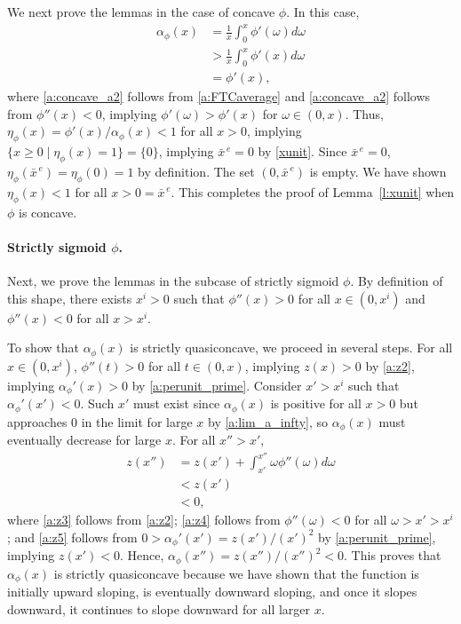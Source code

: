 \documentclass[12pt]{article}
\newcommand{\efficacy}{\phi}
\newcommand{\xunitbar}{\bar{x}^{\,e}}
\newcommand{\xpoi}{x^{i}}
\newcommand{\elasticity}[1]{\eta_{#1}}
\newcommand{\perunit}[1]{\alpha_{#1}}
\begin{document}
We next prove the lemmas in the case of concave $\efficacy$. In
this case,
\begin{align}
\perunit{\efficacy}\!(x) & = \frac{1}{x} \int_0^x \efficacy'(\omega) d\omega \label{a:concave_a1} \\
& > \frac{1}{x} \int_0^x \efficacy'(x) d\omega \label{a:concave_a2} \\
& = \efficacy'(x), \label{a:concave_a3}
\end{align}
where \eqref{a:concave_a2} follows from \eqref{a:FTCaverage} and
\eqref{a:concave_a2} follows from $\efficacy''(x) < 0$, implying
$\efficacy'(\omega) > \efficacy'(x)$ for $\omega \in (0,x)$. Thus,
$\elasticity{\efficacy} \!(x) = \efficacy'(x) /
\perunit{\efficacy}\!(x) < 1$ for all $x > 0$, implying $\{ x \geq 0
\mid \elasticity{\efficacy}\!(x) = 1 \} = \{ 0 \}$, implying $\xunitbar =
0$ by \eqref{xunit}. Since $\xunitbar = 0$,
$\elasticity{\efficacy}\!(\xunitbar) = \elasticity{\efficacy}\!(0) = 1$
by definition. The set $(0,\xunitbar)$ is empty. We have shown
$\elasticity{\efficacy}\!(x) < 1$ for all $x > 0 = \xunitbar$. This
completes the proof of Lemma~\ref{l:xunit} when $\efficacy$ is
concave.

\paragraph{Strictly sigmoid $\efficacy$.} 

Next, we prove the lemmas in the subcase of strictly sigmoid
$\efficacy$. By definition of this shape, there exists $\xpoi > 0$
such that $\efficacy''(x) > 0$ for all $x \in (0, \xpoi)$ and
$\efficacy''(x) < 0$ for all $x > \xpoi$.

To show that $\perunit{\efficacy}\!(x)$ is strictly quasiconcave, we
proceed in several steps. For all $x \in (0, \xpoi)$, $\efficacy''(t)
> 0$ for all $t \in (0, x)$, implying $z(x) > 0$ by \eqref{a:z2},
implying $\perunit{\efficacy}'\!(x) > 0$ by \eqref{a:perunit_prime}.
Consider $x' > \xpoi$ such that $\perunit{\efficacy}'\!(x') < 0$. Such
$x'$ must exist since $\perunit{\efficacy}\!(x)$ is positive for all
$x > 0$ but approaches 0 in the limit for large $x$ by
\eqref{a:lim_a_infty}, so $\perunit{\efficacy}\!(x)$ must eventually
decrease for large $x$. For all $x'' > x'$,
\begin{align}
z(x'') & = z(x') + \int_{x'}^{x''} \omega \efficacy''(\omega) d\omega \label{a:z3} \\
& < z(x') \label{a:z4} \\
& < 0, \label{a:z5}
\end{align}
where \eqref{a:z3} follows from \eqref{a:z2}; \eqref{a:z4} follows
from $\efficacy''(\omega) < 0$ for all $\omega > x' > \xpoi$; and
\eqref{a:z5} follows from $0 > \perunit{\efficacy}'\!(x') = z(x') /
(x')^2$ by \eqref{a:perunit_prime}, implying $z(x') < 0$. Hence,
$\perunit{\efficacy}\!(x'') = z(x'') / (x'')^2 < 0$. This proves that
$\perunit{\efficacy}\!(x)$ is strictly quasiconcave because we have
shown that the function is initially upward sloping, is eventually
downward sloping, and once it slopes downward, it continues to slope
downward for all larger $x$.
\end{document}
